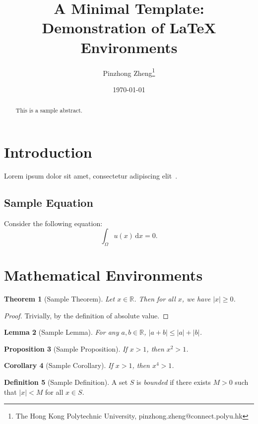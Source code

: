 \documentclass[11pt]{article}
\title{A Minimal Template: Demonstration of LaTeX Environments}
\author{Pinzhong Zheng\thanks{The Hong Kong Polytechnic University, pinzhong.zheng@connect.polyu.hk}}
\date{\today}
\newtheorem{theorem}{Theorem}[section]
\newtheorem{lemma}[theorem]{Lemma}
\newtheorem{proposition}[theorem]{Proposition}
\newtheorem{corollary}[theorem]{Corollary}
\theoremstyle{definition}
\newtheorem{definition}[theorem]{Definition}
\theoremstyle{italicremark}
\newcommand{\abs}[1]{\left\vert #1 \right\vert} %
\newcommand{\RR}{\mathbb{R}} %
\begin{document}
\maketitle

\begin{abstract}
This is a sample abstract. 
\end{abstract}

\section{Introduction}
Lorem ipsum dolor sit amet, consectetur adipiscing elit~\cite{DuEtAl2021MaximumBound}. 

\subsection{Sample Equation}
Consider the following equation:
\begin{equation}\label{eq:sample}
    \int_{\Omega} u(x) \, \mathrm{d}x = 0.
\end{equation}

\section{Mathematical Environments}

\begin{theorem}[Sample Theorem]\label{thm:sample}
Let $x \in \RR$. Then for all $x$, we have $\abs{x} \ge 0$.
\end{theorem}

\begin{proof}
Trivially, by the definition of absolute value.
\end{proof}

\begin{lemma}[Sample Lemma]\label{lem:sample}
For any $a, b \in \RR$, $\abs{a+b} \le \abs{a} + \abs{b}$.
\end{lemma}

\begin{proposition}[Sample Proposition]
If $x > 1$, then $x^2 > 1$.
\end{proposition}

\begin{corollary}[Sample Corollary]
If $x > 1$, then $x^4 > 1$.
\end{corollary}

\begin{definition}[Sample Definition]
A set $S$ is \emph{bounded} if there exists $M > 0$ such that $\abs{x} < M$ for all $x \in S$.
\end{definition}
\end{document}
